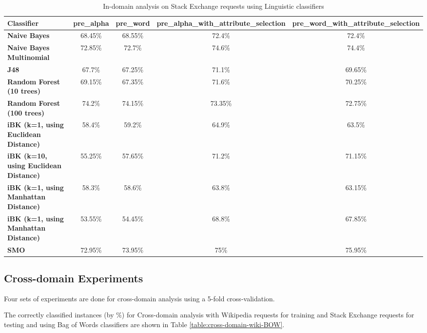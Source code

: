 \documentclass[conference]{IEEEtran}
\begin{document}
\begin{table*}[htbp]
\caption{In-domain analysis on Stack Exchange requests using Linguistic classifiers }
\centering
\vspace{5pt}
\begin{tabular}{|l|c|c|c|c|}
\hline
\textbf{Classifier} & \textbf{pre\_alpha} & \textbf{pre\_word} & \textbf{pre\_alpha\_with\_attribute\_selection} & \textbf{pre\_word\_with\_attribute\_selection} \\
\hline\hline
\textbf{Naive Bayes} & 68.45\% & 68.55\% & 72.4\% & 72.4\% \\ 
\hline
\textbf{Naive Bayes Multinomial} & 72.85\% & 72.7\% & 74.6\% & 74.4\% \\ 
\hline
\textbf{J48} & 67.7\% & 67.25\% & 71.1\% & 69.65\% \\ 
\hline
\textbf{Random Forest (10 trees)} & 69.15\% & 67.35\% & 71.6\% & 70.25\% \\ 
\hline
\textbf{Random Forest (100 trees)} & 74.2\% & 74.15\% & 73.35\% & 72.75\% \\ 
\hline
\textbf{iBK (k=1, using Euclidean Distance)} & 58.4\% & 59.2\% & 64.9\% & 63.5\% \\ 
\hline
\textbf{iBK (k=10, using Euclidean Distance)} & 55.25\% & 57.65\% & 71.2\% & 71.15\% \\ 
\hline
\textbf{iBK (k=1, using Manhattan Distance)} & 58.3\% & 58.6\% & 63.8\% & 63.15\% \\ 
\hline
\textbf{iBK (k=1, using Manhattan Distance)} & 53.55\% & 54.45\% & 68.8\% & 67.85\% \\ 
\hline
\textbf{SMO} & 72.95\% & 73.95\% & 75\% & 75.95\% \\ 
\hline
\hline
\end{tabular}
\label{table:in-domain-stack-Ling}
\end{table*}

\subsection{Cross-domain Experiments}
Four sets of experiments are done for cross-domain analysis using a 5-fold cross-validation. 

The correctly classified instances (by \%) for Cross-domain analysis with Wikipedia requests for training and Stack Exchange requests for testing and using Bag of Words classifiers are shown in Table \ref{table:cross-domain-wiki-BOW}.
\end{document}
